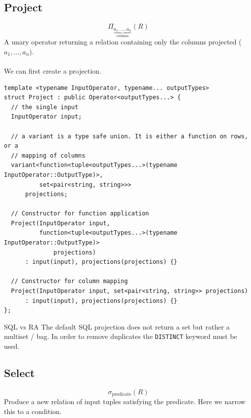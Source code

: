 \subsection{Project}
\[\Pi_{\underbrace{{a_1, \dots, a_n}}_\text{columns}}(R)\]
A unary operator returning a relation containing only the columns projected ($a_1, \dots, a_n$).
\\
\\ We can first create a projection.
\begin{verbatim}
template <typename InputOperator, typename... outputTypes>
struct Project : public Operator<outputTypes...> {
  // the single input
  InputOperator input;

  // a variant is a type safe union. It is either a function on rows, or a 
  // mapping of columns 
  variant<function<tuple<outputTypes...>(typename InputOperator::OutputType)>,
          set<pair<string, string>>>
      projections;

  // Constructor for function application
  Project(InputOperator input,
          function<tuple<outputTypes...>(typename InputOperator::OutputType)>
              projections)
      : input(input), projections(projections) {}

  // Constructor for column mapping
  Project(InputOperator input, set<pair<string, string>> projections)
      : input(input), projections(projections) {}
};
\end{verbatim}

\begin{sidenotebox}{SQL vs RA}
  The default SQL projection does not return a set but rather a multiset / bag. In order to remove duplicates the \texttt{DISTINCT} keyword must be used.
\end{sidenotebox}

\subsection{Select}
\[\sigma_{\text{predicate}}(R) \]
Produce a new relation of input tuples satisfying the predicate. Here we narrow this to a condition.

